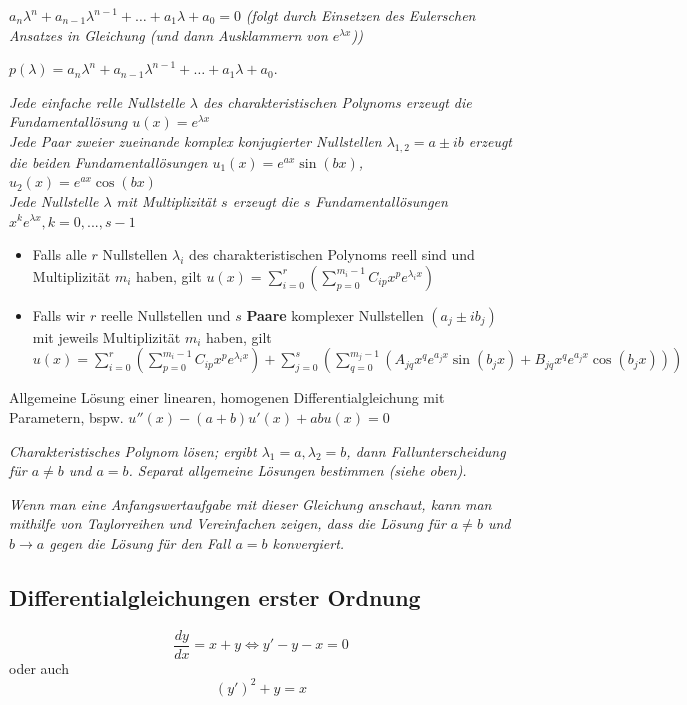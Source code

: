  $a_n \lambda^n + a_{n-1} \lambda^{n-1}+ \dots + a_1 \lambda + a_0 =0$
\textit{(folgt durch Einsetzen des Eulerschen Ansatzes in Gleichung (und dann Ausklammern von $e^{\lambda x}$))} 

 $p(\lambda) = a_n \lambda^n + a_{n-1} \lambda^{n-1}+ \dots + a_1 \lambda + a_0$.

\textit{
    Jede einfache relle Nullstelle $\lambda$ des charakteristischen Polynoms erzeugt die Fundamentallösung $u(x)=e^{\lambda x}$\\
    Jede Paar zweier zueinande komplex konjugierter Nullstellen $\lambda_{1,2}=a\pm ib$ erzeugt die beiden Fundamentallösungen $u_1(x)=e^{ax}\sin(bx)$, $u_2(x)=e^{ax}\cos(bx)$\\
    Jede Nullstelle $\lambda$ mit Multiplizität $s$ erzeugt die $s$ Fundamentallösungen $x^ke^{\lambda x}, k=0,...,s-1$
}

\begin{itemize}
    \item Falls alle $r$ Nullstellen $\lambda_i$ des charakteristischen Polynoms reell sind und Multiplizität $m_i$ haben, gilt $u(x)=\sum_{i=0}^{r}(\sum_{p=0}^{m_i - 1}C_{ip} x^p e^{\lambda_i x})$
    \item Falls wir $r$ reelle Nullstellen und $s$ \textbf{Paare} komplexer Nullstellen $(a_j \pm ib_j)$ mit jeweils Multiplizität $m_i$ haben, gilt $u(x)=\sum_{i=0}^{r}(\sum_{p=0}^{m_i - 1}C_{ip} x^p e^{\lambda_i x}) + \sum_{j=0}^{s} (\sum_{q=0}^{m_j - 1}(A_{jq} x^q e^{a_j x} \sin(b_j x)+B_{jq} x^q e^{a_j x} \cos(b_j x)))$    
\end{itemize}

\begin{exercise}
    Allgemeine Lösung einer linearen, homogenen Differentialgleichung mit Parametern, bspw. $u''(x)-(a+b)u'(x)+abu(x)=0$

    \textit{Charakteristisches Polynom lösen; ergibt $\lambda_1 = a, \lambda_2 = b$, dann Fallunterscheidung für $a\neq b$ und $a=b$. Separat allgemeine Lösungen bestimmen (siehe oben).}

    \small{\textit{Wenn man eine Anfangswertaufgabe mit dieser Gleichung anschaut, kann man mithilfe von Taylorreihen und Vereinfachen zeigen, dass die Lösung für $a \neq b$ und $b \rightarrow a$ gegen die Lösung für den Fall $a=b$ konvergiert.}}
\end{exercise}

\subsection{Differentialgleichungen erster Ordnung}
$$\frac{dy}{dx}=x+y\iff y'-y-x=0$$
oder auch
$$(y')^2+y=x$$

